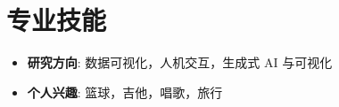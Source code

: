 \documentclass[AutoFakeBold]{resume}
\begin{document}
\section{\makebox[.75em][c]{\faCogs} \textbf{\fangsong 专业技能}}
\noindent
\begin{minipage}[t]{.5\textwidth}
    \begin{itemize}
    \item \textbf{\kaishu 研究方向}: 数据可视化，人机交互，生成式 AI 与可视化
    \end{itemize}
\end{minipage}
\begin{minipage}[t]{.5\textwidth}
    \begin{itemize}
    \item \textbf{\kaishu 个人兴趣}: 篮球，吉他，唱歌，旅行
    \end{itemize}
\end{minipage}
\end{document}

